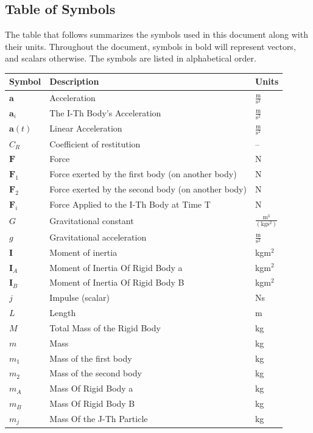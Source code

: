\documentclass[12pt]{article}
\begin{document}
\subsection{Table of Symbols}
\label{Sec:ToS}
The table that follows summarizes the symbols used in this document along with their units. Throughout the document, symbols in bold will represent vectors, and scalars otherwise. The symbols are listed in alphabetical order.
\begin{longtabu}{l X[l] l}
\toprule
Symbol & Description & Units
\\
\midrule
$\mathbf{a}$ & Acceleration & $\frac{\text{m}}{\text{s}^{2}}$
\\
${\mathbf{a}_{i}}$ & The I-Th Body's Acceleration & $\frac{\text{m}}{\text{s}^{2}}$
\\
$\mathbf{a}(t)$ & Linear Acceleration & $\frac{\text{m}}{\text{s}^{2}}$
\\
${C_{R}}$ & Coefficient of restitution & --
\\
$\mathbf{F}$ & Force & N
\\
${\mathbf{F}_{1}}$ & Force exerted by the first body (on another body) & N
\\
${\mathbf{F}_{2}}$ & Force exerted by the second body (on another body) & N
\\
${\mathbf{F}_{i}}$ & Force Applied to the I-Th Body at Time T & N
\\
$G$ & Gravitational constant & $\frac{\text{m}^{3}}{(\text{kg}\text{s}^{2})}$
\\
$g$ & Gravitational acceleration & $\frac{\text{m}}{\text{s}^{2}}$
\\
$\mathbf{I}$ & Moment of inertia & kg$\text{m}^{2}$
\\
${\mathbf{I}_{A}}$ & Moment of Inertia Of Rigid Body a & kg$\text{m}^{2}$
\\
${\mathbf{I}_{B}}$ & Moment of Inertia Of Rigid Body B & kg$\text{m}^{2}$
\\
$j$ & Impulse (scalar) & Ns
\\
$L$ & Length & m
\\
$M$ & Total Mass of the Rigid Body & kg
\\
$m$ & Mass & kg
\\
${m_{1}}$ & Mass of the first body & kg
\\
${m_{2}}$ & Mass of the second body & kg
\\
${m_{A}}$ & Mass Of Rigid Body a & kg
\\
${m_{B}}$ & Mass Of Rigid Body B & kg
\\
${m_{j}}$ & Mass Of the J-Th Particle & kg

\end{longtabu}
\end{document}
